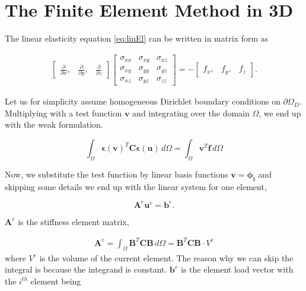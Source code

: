\section{The Finite Element Method in 3D}
\label{sec:FEM}

The linear elasticity equation \eqref{eq:linEl} can be written in matrix form as

\begin{align*}
\begin{bmatrix}
\frac{\partial}{\partial x}, & \frac{\partial}{\partial y}, & \frac{\partial}{\partial z}
\end{bmatrix}
\begin{bmatrix}
\sigma_{xx} & \sigma_{xy} & \sigma_{xz} \\
\sigma_{xy} & \sigma_{yy} & \sigma_{yz} \\
\sigma_{xz} & \sigma_{yz} & \sigma_{zz}
\end{bmatrix} = -
\begin{bmatrix}
f_x, & f_y, & f_z 
\end{bmatrix}.
\end{align*}

Let us for simplicity assume homogeneous Dirichlet boundary conditions on $\partial \Omega_D$. Multiplying with a test function $\bm{v}$ and integrating over the domain $\Omega$, we end up with the weak formulation. 

\begin{equation}
\int_\Omega \bm{\epsilon}(\bm{v})^T \bm{C} \bm{\epsilon}(\bm{u}) \, d\Omega = \int_\Omega \bm{v}^T \bm{f} \, d\Omega
\end{equation}

Now, we substitute the test function by linear basis functions $\bm{v} = \bm{\phi_i}$ and skipping some details we end up with the linear system for one element,

\begin{equation}
\label{eq:linear-system}
\bm{A}^e \bm{u}^e = \bm{b}^e.
\end{equation}

$\bm{A}^e$ is the stiffness element matrix,

\begin{align}
\bm{A}^e = \int_\Omega \bm{B}^T \bm{C} \bm{B} \, d\Omega = \bm{B}^T \bm{C} \bm{B} \cdot V^e
\end{align}
where $V^e$ is the volume of the current element. The reason why we can skip the integral is because the integrand is constant. $\bm{b}^e$ is the element load vector with the $i^{th}$ element being 

